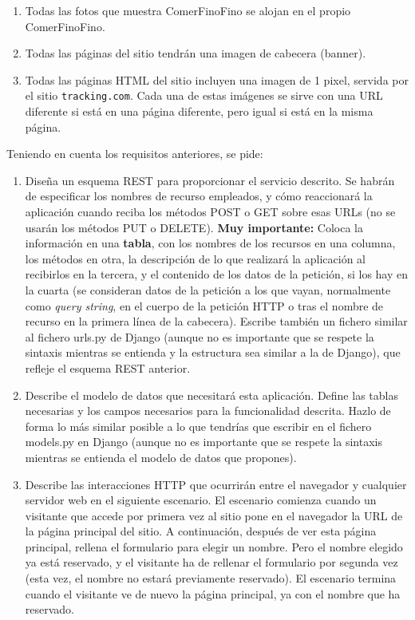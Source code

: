 \begin{enumerate}
\item Todas las fotos que muestra ComerFinoFino se alojan en el propio ComerFinoFino.
\item Todas las páginas del sitio tendrán una imagen de cabecera (banner).
\item Todas las páginas HTML del sitio incluyen una imagen de 1 pixel, servida por el sitio \texttt{tracking.com}. Cada una de estas imágenes se sirve con una URL diferente si está en una página diferente, pero igual si está en la misma página.

\end{enumerate}


Teniendo en cuenta los requisitos anteriores, se pide:

\begin{enumerate}
\item Diseña un esquema REST para proporcionar el servicio descrito. Se habrán de especificar los nombres de recurso empleados, y cómo reaccionará la aplicación cuando reciba los métodos POST o GET sobre esas URLs (no se usarán los métodos PUT o DELETE). \textbf{Muy importante:} Coloca la información en una \textbf{tabla}, con los nombres de los recursos en una columna, los métodos en otra, la descripción de lo que realizará la aplicación al recibirlos en la tercera, y el contenido de los datos de la petición, si los hay en la cuarta (se consideran datos de la petición a los que vayan, normalmente como \emph{query string}, en el cuerpo de la petición HTTP o tras el nombre de recurso en la primera línea de la cabecera). Escribe también un fichero similar al fichero urls.py de Django (aunque no es importante que se respete la sintaxis mientras se entienda y la estructura sea similar a la de Django), que refleje el esquema REST anterior. 

\item Describe el modelo de datos que necesitará esta aplicación. Define las tablas necesarias y los campos necesarios para la funcionalidad descrita. Hazlo de forma lo más similar posible a lo que tendrías que escribir en el fichero models.py en Django (aunque no es importante que se respete la sintaxis mientras se entienda el modelo de datos que propones).

\item Describe las interacciones HTTP que ocurrirán entre el navegador y cualquier servidor web en el siguiente escenario. El escenario comienza cuando un visitante que accede por primera vez al sitio pone en el navegador la URL de la página principal del sitio. A continuación, después de ver esta página principal, rellena el formulario para elegir un nombre. Pero el nombre elegido ya está reservado, y el visitante ha de rellenar el formulario por segunda vez (esta vez, el nombre no estará previamente reservado). El escenario termina cuando el visitante ve de nuevo la página principal, ya con el nombre que ha reservado.


\end{enumerate}
